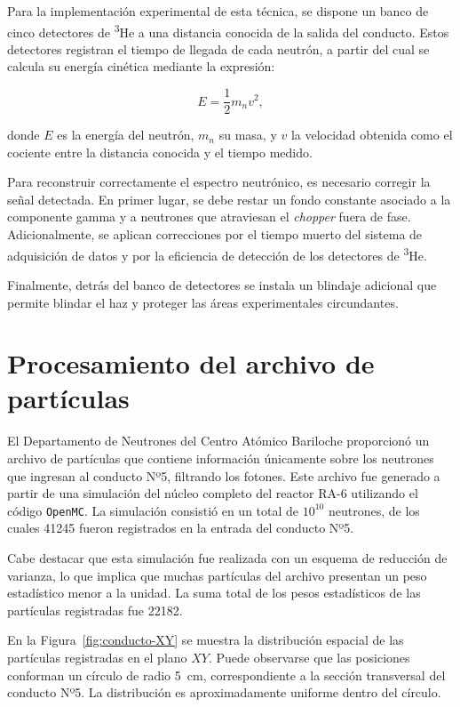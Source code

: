 Para la implementación experimental de esta técnica, se dispone un banco de cinco detectores de \textsuperscript{3}He a una distancia conocida de la salida del conducto. Estos detectores registran el tiempo de llegada de cada neutrón, a partir del cual se calcula su energía cinética mediante la expresión:

\begin{equation}
E = \frac{1}{2} m_n v^2,
\end{equation}

donde $E$ es la energía del neutrón, $m_n$ su masa, y $v$ la velocidad obtenida como el cociente entre la distancia conocida y el tiempo medido.

Para reconstruir correctamente el espectro neutrónico, es necesario corregir la señal detectada. En primer lugar, se debe restar un fondo constante asociado a la componente gamma y a neutrones que atraviesan el \textit{chopper} fuera de fase. Adicionalmente, se aplican correcciones por el tiempo muerto del sistema de adquisición de datos y por la eficiencia de detección de los detectores de \textsuperscript{3}He.

Finalmente, detrás del banco de detectores se instala un blindaje adicional que permite blindar el haz y proteger las áreas experimentales circundantes.

\section{Procesamiento del archivo de partículas}

El Departamento de Neutrones del Centro Atómico Bariloche proporcionó un archivo de partículas que contiene información únicamente sobre los neutrones que ingresan al conducto Nº5, filtrando los fotones. Este archivo fue generado a partir de una simulación del núcleo completo del reactor RA-6 utilizando el código \texttt{OpenMC}. La simulación consistió en un total de $10^{10}$ neutrones, de los cuales 41245 fueron registrados en la entrada del conducto Nº5.

Cabe destacar que esta simulación fue realizada con un esquema de reducción de varianza, lo que implica que muchas partículas del archivo presentan un peso estadístico menor a la unidad. La suma total de los pesos estadísticos de las partículas registradas fue 22182.

En la Figura~\ref{fig:conducto-XY} se muestra la distribución espacial de las partículas registradas en el plano $XY$. Puede observarse que las posiciones conforman un círculo de radio 5~cm, correspondiente a la sección transversal del conducto Nº5. La distribución es aproximadamente uniforme dentro del círculo.

